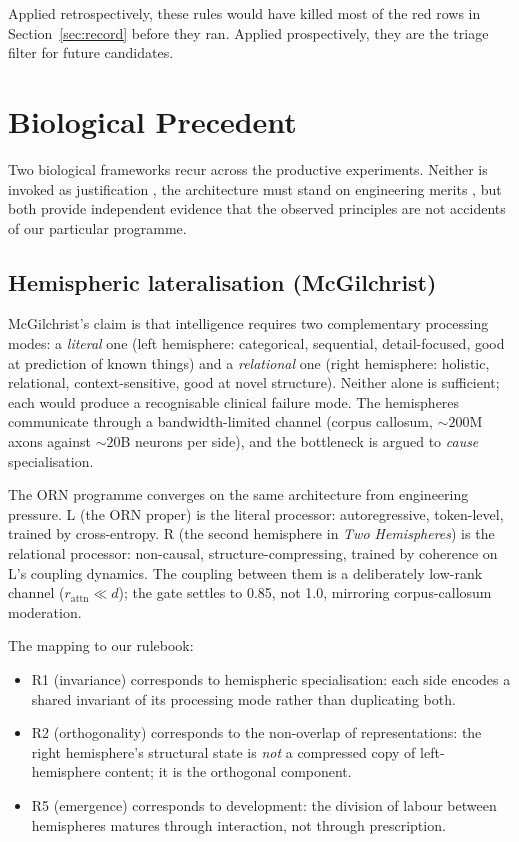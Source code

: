 \documentclass[11pt, a4paper]{article}
\begin{document}
Applied retrospectively, these rules would have killed most of the red rows in Section~\ref{sec:record} before they ran. Applied prospectively, they are the triage filter for future candidates.

\section{Biological Precedent}
\label{sec:biology}

Two biological frameworks recur across the productive experiments. Neither is invoked as justification ,  the architecture must stand on engineering merits ,  but both provide independent evidence that the observed principles are not accidents of our particular programme.

\subsection{Hemispheric lateralisation (McGilchrist)}

McGilchrist's claim is that intelligence requires two complementary processing modes: a \emph{literal} one (left hemisphere: categorical, sequential, detail-focused, good at prediction of known things) and a \emph{relational} one (right hemisphere: holistic, relational, context-sensitive, good at novel structure). Neither alone is sufficient; each would produce a recognisable clinical failure mode. The hemispheres communicate through a bandwidth-limited channel (corpus callosum, $\sim 200$M axons against $\sim 20$B neurons per side), and the bottleneck is argued to \emph{cause} specialisation.

The ORN programme converges on the same architecture from engineering pressure. L (the ORN proper) is the literal processor: autoregressive, token-level, trained by cross-entropy. R (the second hemisphere in \emph{Two Hemispheres}) is the relational processor: non-causal, structure-compressing, trained by coherence on L's coupling dynamics. The coupling between them is a deliberately low-rank channel ($r_{\mathrm{attn}} \ll d$); the gate settles to 0.85, not 1.0, mirroring corpus-callosum moderation.

The mapping to our rulebook:
\begin{itemize}[nosep]
\item R1 (invariance) corresponds to hemispheric specialisation: each side encodes a shared invariant of its processing mode rather than duplicating both.
\item R2 (orthogonality) corresponds to the non-overlap of representations: the right hemisphere's structural state is \emph{not} a compressed copy of left-hemisphere content; it is the orthogonal component.
\item R5 (emergence) corresponds to development: the division of labour between hemispheres matures through interaction, not through prescription.
\end{itemize}
\end{document}
